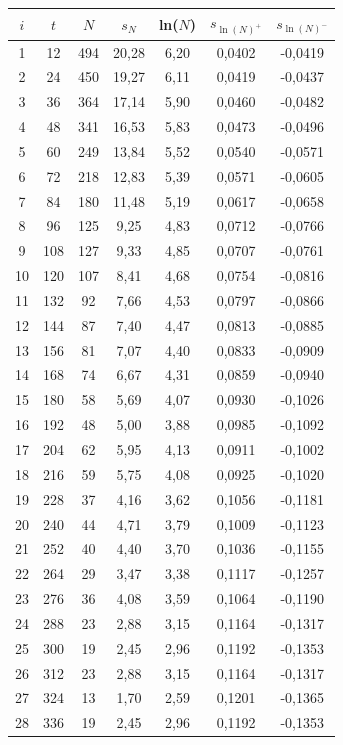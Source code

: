 \renewcommand{\arraystretch}{1.1}
\begin{table}[H]
 \begin{tabular}{c|c|c|c|c|c|c}
 $i$ & $t$ & $N$ & $s_N$ & ln($N$) & $s_{\ln(N)^+}$ & $s_{\ln(N)^-}$ \\
 \hline
1&	12&	494&	20,28&	6,20&	0,0402&	-0,0419\\
2&	24&	450&	19,27&	6,11&	0,0419&	-0,0437\\
3&	36&	364&	17,14&	5,90&	0,0460&	-0,0482\\
4&	48&	341&	16,53&	5,83&	0,0473&	-0,0496\\
5&	60&	249&	13,84&	5,52&	0,0540&	-0,0571\\
6&	72&	218&	12,83&	5,39&	0,0571&	-0,0605\\
7&	84&	180&	11,48&	5,19&	0,0617&	-0,0658\\
8&	96&	125&	9,25&	4,83&	0,0712&	-0,0766\\
9&	108&	127&	9,33&	4,85&	0,0707&	-0,0761\\
10&	120&	107&	8,41&	4,68&	0,0754&	-0,0816\\
\hline
11&	132&	92&	7,66&	4,53&	0,0797&	-0,0866\\
12&	144&	87&	7,40&	4,47&	0,0813&	-0,0885\\
13&	156&	81&	7,07&	4,40&	0,0833&	-0,0909\\
14&	168&	74&	6,67&	4,31&	0,0859&	-0,0940\\
15&	180&	58&	5,69&	4,07&	0,0930&	-0,1026\\
16&	192&	48&	5,00&	3,88&	0,0985&	-0,1092\\
17&	204&	62&	5,95&	4,13&	0,0911&	-0,1002\\
18&	216&	59&	5,75&	4,08&	0,0925&	-0,1020\\
19&	228&	37&	4,16&	3,62&	0,1056&	-0,1181\\
20&	240&	44&	4,71&	3,79&	0,1009&	-0,1123\\
21&	252&	40&	4,40&	3,70&	0,1036&	-0,1155\\
22&	264&	29&	3,47&	3,38&	0,1117&	-0,1257\\
23&	276&	36&	4,08&	3,59&	0,1064&	-0,1190\\
24&	288&	23&	2,88&	3,15&	0,1164&	-0,1317\\
25&	300&	19&	2,45&	2,96&	0,1192&	-0,1353\\
26&	312&	23&	2,88&	3,15&	0,1164&	-0,1317\\
\hline
27&	324&	13&	1,70&	2,59&	0,1201&	-0,1365\\
28&	336&	19&	2,45&	2,96&	0,1192&	-0,1353\\

\end{tabular}
\end{table}
